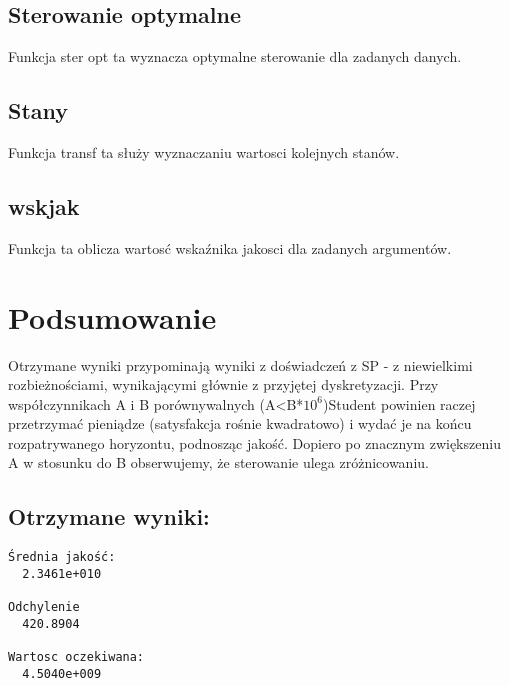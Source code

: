 \documentclass[11pt,a4paper]{article}
\begin{document}
\subsection{Sterowanie optymalne}
Funkcja ster opt ta wyznacza optymalne sterowanie dla zadanych danych.

\subsection{Stany}
Funkcja transf ta służy wyznaczaniu wartosci kolejnych stanów.
\subsection{wskjak}
Funkcja ta oblicza wartosć wskaźnika jakosci dla zadanych argumentów.

\section{Podsumowanie}
Otrzymane wyniki przypominają wyniki z doświadczeń z SP - z niewielkimi rozbieżnościami, wynikającymi głównie z przyjętej dyskretyzacji.
Przy współczynnikach A i B porównywalnych (A<B*$10^6$)Student powinien raczej przetrzymać pieniądze (satysfakcja rośnie kwadratowo) i wydać je na końcu rozpatrywanego horyzontu, podnosząc jakość. Dopiero po znacznym zwiększeniu A w stosunku do B obserwujemy, że sterowanie ulega zróżnicowaniu.
\subsection{Otrzymane wyniki:}
\begin{verbatim}
Średnia jakość:
  2.3461e+010

Odchylenie
  420.8904

Wartosc oczekiwana:
  4.5040e+009
\end{verbatim}
\end{document}
